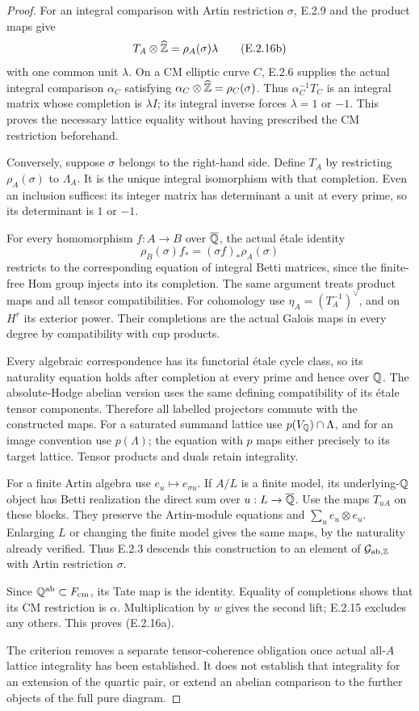 \begin{proof}
For an integral comparison with Artin restriction \(\sigma\),
E.2.9 and the product maps give
\[
 T_A\otimes\widehat{\mathbb Z}=\rho_A(\sigma)\lambda
 \tag{E.2.16b}
\]
with one common unit \(\lambda\).
On a CM elliptic curve \(C\), E.2.6 supplies the actual
integral comparison \(\alpha_C\) satisfying
\(\alpha_C\otimes\widehat{\mathbb Z}=\rho_C(\sigma)\).
Thus \(\alpha_C^{-1}T_C\) is an integral matrix whose
completion is \(\lambda I\); its integral inverse forces
\(\lambda=1\) or \(-1\).
This proves the necessary lattice equality without having
prescribed the CM restriction beforehand.

Conversely, suppose \(\sigma\) belongs to the right-hand side.
Define \(T_A\) by restricting \(\rho_A(\sigma)\) to
\(\Lambda_A\). It is the unique integral isomorphism with
that completion. Even an inclusion suffices: its integer
matrix has determinant a unit at every prime, so its determinant
is \(1\) or \(-1\).

For every homomorphism \(f:A\to B\) over \(\overline{\mathbb Q}\), the
actual étale identity
\[
 \rho_B(\sigma)f_*=(\sigma f)_*\rho_A(\sigma)
\]
restricts to the corresponding equation of integral Betti
matrices, since the finite-free Hom group injects into its
completion. The same argument treats product maps and all
tensor compatibilities. For cohomology use
\(\eta_A=(T_A^{-1})^\vee\), and on \(H^r\) its exterior
power. Their completions are the actual Galois maps in every
degree by compatibility with cup products.

Every algebraic correspondence has its functorial étale cycle
class, so its naturality equation holds after completion at
every prime and hence over \(\mathbb Q\). The absolute-Hodge
abelian version uses the same defining compatibility of its
étale tensor components. Therefore all labelled projectors
commute with the constructed maps. For a saturated summand
lattice use \(p(V_{\mathbb Q})\cap\Lambda\), and for an image
convention use \(p(\Lambda)\); the equation with \(p\) maps
either precisely to its target lattice. Tensor products and
duals retain integrality.

For a finite Artin algebra use \(e_u\mapsto e_{\sigma u}\).
If \(A/L\) is a finite model, its underlying-\(\mathbb Q\) object
has Betti realization the direct sum over \(u:L\to\overline{\mathbb Q}\).
Use the maps \(T_{uA}\) on these blocks. They preserve the
Artin-module equations and
\(\sum_u e_u\otimes e_u\).
Enlarging \(L\) or changing the finite model gives the same
maps, by the naturality already verified. Thus E.2.3 descends
this construction to an element of
\(\mathcal G_{\mathrm{ab},\mathbb Z}\) with Artin restriction
\(\sigma\).

Since \(\mathbb Q^{\mathrm{ab}}\subset F_{\mathrm{cm}}\), its Tate
map is the identity. Equality of completions shows that its
CM restriction is \(\alpha\).
Multiplication by \(w\) gives the second lift; E.2.15 excludes
any others. This proves (E.2.16a).

The criterion removes a separate tensor-coherence obligation
once actual all-\(A\) lattice integrality has been established.
It does not establish that integrality for an extension of the
quartic pair, or extend an abelian comparison to the further
objects of the full pure diagram.
\end{proof}

